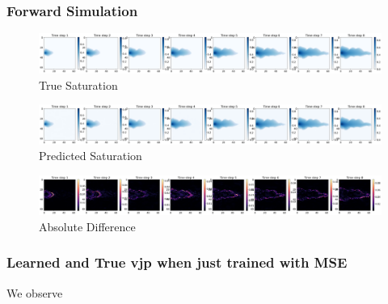 \documentclass[
]{article}
\begin{document}
\subsubsection{Forward Simulation}\label{forward-simulation}

\begin{figure}[H]

{\centering \includegraphics[width=1\textwidth,height=\textheight]{../../plot/GCS_channel_plot/FNO_GCS_lowest_MSE_True.png}

}

\caption{True Saturation}

\end{figure}%
\begin{figure}[H]

{\centering \includegraphics[width=1\textwidth,height=\textheight]{../../plot/GCS_channel_plot/FNO_GCS_lowest_MSE_Pred.png}

}

\caption{Predicted Saturation}

\end{figure}%
\begin{figure}[H]

{\centering \includegraphics[width=1\textwidth,height=\textheight]{../../plot/GCS_channel_plot/FNO_GCS_lowest_MSE_diff.png}

}

\caption{Absolute Difference}

\end{figure}%

\subsubsection{Learned and True vjp when just trained with
MSE}\label{learned-and-true-vjp-when-just-trained-with-mse}

We observe
\end{document}
